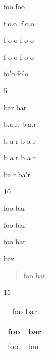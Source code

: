
\def\mytitle{Abbreviations}













\gls{foo} \gls{foo}

\gls{f.o.o.} \gls{f.o.o.}

f-o-o f-o-o

\gls{f o o} \gls{f o o}

fo'o fo'o

5

\gls{bar} \gls{bar}

\gls{b.a.r.} \gls{b.a.r.}

\gls{b-a-r} \gls{b-a-r}

\gls{b a r} \gls{b a r}

\gls{ba'r} \gls{ba'r}

10

\gls{foo bar}

\gls{foo}
\gls{bar}

\gls{foo} \gls{bar}

\gls{baz}

\begin{quote}
\gls{foo bar}
\end{quote}

15

\begin{table}[htbp]
\begin{minipage}{\linewidth}
\setlength{\tymax}{0.5\linewidth}
\centering
\small
\caption{\gls{foo bar}}
\label{foobar}
\begin{tabulary}{\textwidth}{@{}ll@{}} \toprule
 \gls{foo} & \gls{bar} \\
\midrule

 \gls{foo} & \gls{bar} \\
\bottomrule

\end{tabulary}
\end{minipage}
\end{table}

